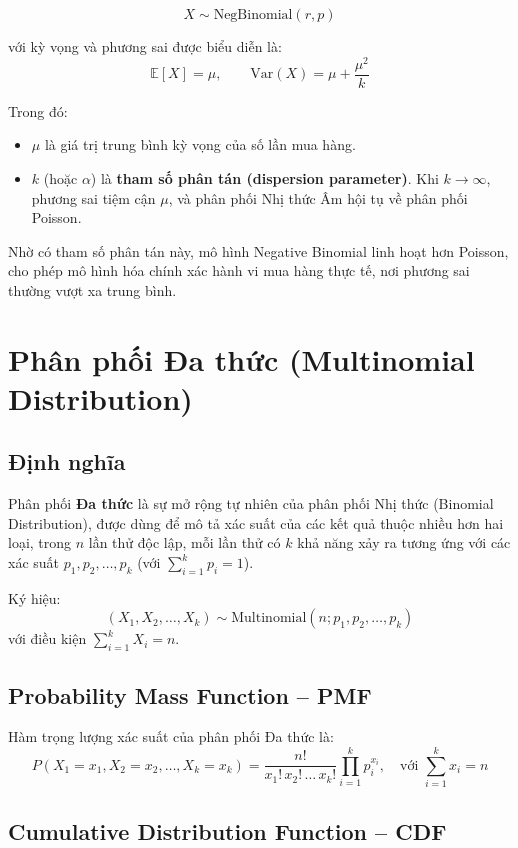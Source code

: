 \[
X \sim \mathrm{NegBinomial}(r, p)
\]

với kỳ vọng và phương sai được biểu diễn là:
\[
\mathbb{E}[X] = \mu, \qquad
\mathrm{Var}(X) = \mu + \frac{\mu^2}{k}
\]

Trong đó:
\begin{itemize}
    \item $\mu$ là giá trị trung bình kỳ vọng của số lần mua hàng.
    \item $k$ (hoặc $\alpha$) là \textbf{tham số phân tán (dispersion parameter)}.  
    Khi $k \to \infty$, phương sai tiệm cận $\mu$, và phân phối Nhị thức Âm hội tụ về phân phối Poisson.
\end{itemize}

Nhờ có tham số phân tán này, mô hình Negative Binomial linh hoạt hơn Poisson,  
cho phép mô hình hóa chính xác hành vi mua hàng thực tế, nơi phương sai thường vượt xa trung bình.


\section{Phân phối Đa thức (Multinomial Distribution)}

\subsection{Định nghĩa}

Phân phối \textbf{Đa thức} là sự mở rộng tự nhiên của phân phối Nhị thức (Binomial Distribution),  
được dùng để mô tả xác suất của các kết quả thuộc nhiều hơn hai loại,  
trong $n$ lần thử độc lập, mỗi lần thử có $k$ khả năng xảy ra tương ứng với các xác suất $p_1, p_2, \dots, p_k$ (với $\sum_{i=1}^{k} p_i = 1$).  

Ký hiệu:
\[
(X_1, X_2, \dots, X_k) \sim \mathrm{Multinomial}(n; p_1, p_2, \dots, p_k)
\]
với điều kiện $\sum_{i=1}^{k} X_i = n$.

\subsection{Probability Mass Function – PMF}

Hàm trọng lượng xác suất của phân phối Đa thức là:
\[
P(X_1 = x_1, X_2 = x_2, \dots, X_k = x_k) 
= \frac{n!}{x_1! \, x_2! \, \dots \, x_k!} 
\prod_{i=1}^{k} p_i^{x_i},
\quad \text{với } \sum_{i=1}^{k} x_i = n
\]

\subsection{Cumulative Distribution Function – CDF}

